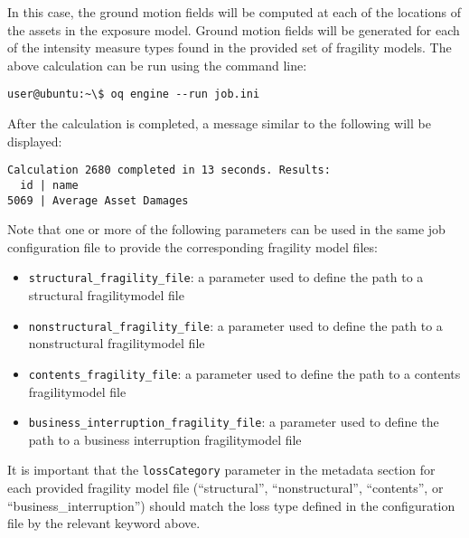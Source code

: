 In this case, the ground motion fields will be computed at each of the
locations of the assets in the exposure model. Ground motion fields will be
generated for each of the intensity measure types found in the provided set of
fragility models. The above calculation can be run using the command line:

\begin{verbatim}
user@ubuntu:~\$ oq engine --run job.ini
\end{verbatim}

After the calculation is completed, a message similar to the following will be
displayed:

\begin{verbatim}
Calculation 2680 completed in 13 seconds. Results:
  id | name
5069 | Average Asset Damages
\end{verbatim}

Note that one or more of the following parameters can be used in the same job
configuration file to provide the corresponding fragility model files:

\begin{itemize}

  \item \Verb+structural_fragility_file+: a parameter used to define the path
    to a structural \gls{fragilitymodel} file

  \item \Verb+nonstructural_fragility_file+: a parameter used to define the path
    to a nonstructural \gls{fragilitymodel} file

  \item \Verb+contents_fragility_file+: a parameter used to define the path
    to a contents \gls{fragilitymodel} file

  \item \Verb+business_interruption_fragility_file+: a parameter used to define
    the path to a business interruption \gls{fragilitymodel} file

\end{itemize}

It is important that the \Verb+lossCategory+ parameter in the metadata section
for each provided fragility model file (``structural'', ``nonstructural'',
``contents'', or ``business\_interruption'') should match the loss type
defined in the configuration file by the relevant keyword above.


